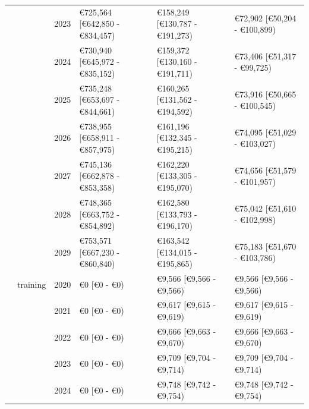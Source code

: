 \documentclass[
]{article}
\begin{document}
\begin{landscape}
\begin{longtable}[t]{llrlll}
\cmidrule{3-6}\nopagebreak
\hspace{1em} &  & 2023 & €725,564 [€642,850 - €834,457) & €158,249 [€130,787 - €191,273) & €72,902 [€50,204 - €100,899)\\
\cmidrule{3-6}\nopagebreak
\hspace{1em} &  & 2024 & €730,940 [€645,972 - €835,152) & €159,372 [€130,160 - €191,711) & €73,406 [€51,317 - €99,725)\\
\cmidrule{3-6}\nopagebreak
\hspace{1em} &  & 2025 & €735,248 [€653,697 - €844,661) & €160,265 [€131,562 - €194,592) & €73,916 [€50,665 - €100,545)\\
\cmidrule{3-6}\nopagebreak
\hspace{1em} &  & 2026 & €738,955 [€658,911 - €857,975) & €161,196 [€132,345 - €195,215) & €74,095 [€51,029 - €103,027)\\
\cmidrule{3-6}\nopagebreak
\hspace{1em} &  & 2027 & €745,136 [€662,878 - €853,358) & €162,220 [€133,305 - €195,070) & €74,656 [€51,579 - €101,957)\\
\cmidrule{3-6}\nopagebreak
\hspace{1em} &  & 2028 & €748,365 [€663,752 - €854,892) & €162,580 [€133,793 - €196,170) & €75,042 [€51,610 - €102,998)\\
\cmidrule{3-6}\nopagebreak
\hspace{1em} &  & 2029 & €753,571 [€667,230 - €860,840) & €163,542 [€134,015 - €195,865) & €75,183 [€51,670 - €103,786)\\
\cmidrule{2-6}\nopagebreak
\hspace{1em} & training & 2020 & €0 [€0 - €0) & €9,566 [€9,566 - €9,566) & €9,566 [€9,566 - €9,566)\\
\cmidrule{3-6}\nopagebreak
\hspace{1em} &  & 2021 & €0 [€0 - €0) & €9,617 [€9,615 - €9,619) & €9,617 [€9,615 - €9,619)\\
\cmidrule{3-6}\nopagebreak
\hspace{1em} &  & 2022 & €0 [€0 - €0) & €9,666 [€9,663 - €9,670) & €9,666 [€9,663 - €9,670)\\
\cmidrule{3-6}\nopagebreak
\hspace{1em} &  & 2023 & €0 [€0 - €0) & €9,709 [€9,704 - €9,714) & €9,709 [€9,704 - €9,714)\\
\cmidrule{3-6}\nopagebreak
\hspace{1em} &  & 2024 & €0 [€0 - €0) & €9,748 [€9,742 - €9,754) & €9,748 [€9,742 - €9,754)\\

\end{longtable}
\end{landscape}
\end{document}

